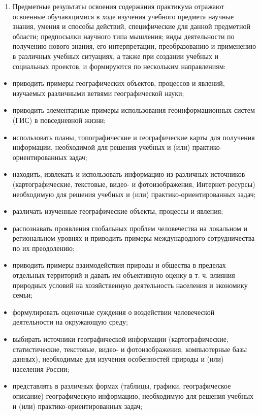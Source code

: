 \documentclass[
  11pt,
  russian,
]{book}
\providecommand{\tightlist}{%
  \setlength{\itemsep}{0pt}\setlength{\parskip}{0pt}}
\begin{document}
\begin{enumerate}
\def\labelenumi{\arabic{enumi}.}
\setcounter{enumi}{2}
\tightlist
\item
  Предметные результаты освоения содержания практикума отражают освоенные обучающимися в ходе изучения учебного предмета научные знания, умения и способы действий, специфические для данной предметной области; предпосылки научного типа мышления; виды деятельности по получению нового знания, его интерпретации, преобразованию и применению в различных учебных ситуациях, а также при создании учебных и социальных проектов, и формируются по нескольким направлениям:
\end{enumerate}

\begin{itemize}
\item
  приводить примеры географических объектов, процессов и явлений, изучаемых различными ветвями географической науки;
\item
  приводить элементарные примеры использования геоинформационных систем (ГИС) в повседневной жизни;
\item
  использовать планы, топографические и географические карты для получения информации, необходимой для решения учебных и (или) практико-ориентированных задач;
\item
  находить, извлекать и использовать информацию из различных источников (картографические, текстовые, видео- и фотоизображения, Интернет-ресурсы) необходимую для решения учебных и (или) практико-ориентированных задач;
\item
  различать изученные географические объекты, процессы и явления;
\item
  распознавать проявления глобальных проблем человечества на локальном и региональном уровнях и приводить примеры международного сотрудничества по их преодолению;
\item
  приводить примеры взаимодействия природы и общества в пределах отдельных территорий и давать им объективную оценку в т. ч. влияния природных условий на хозяйственную деятельность населения и экономику семьи;
\item
  формулировать оценочные суждения о воздействии человеческой деятельности на окружающую среду;
\item
  выбирать источники географической информации (картографические, статистические, текстовые, видео- и фотоизображения, компьютерные базы данных), необходимые для изучения особенностей природы и (или) населения России;
\item
  представлять в различных формах (таблицы, графики, географическое описание) географическую информацию, необходимую для решения учебных и (или) практико-ориентированных задач;

\end{itemize}
\end{document}
